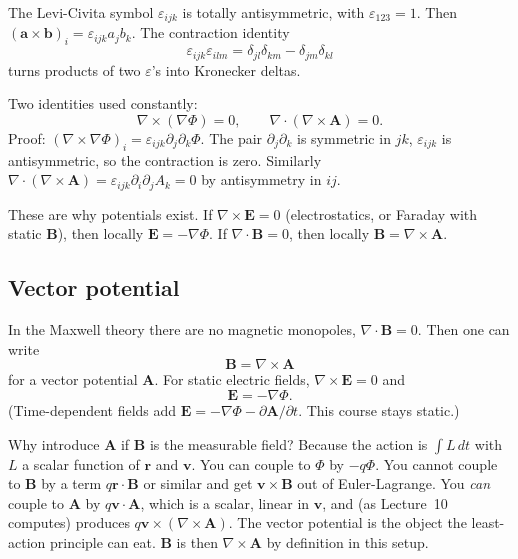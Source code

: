\documentclass[11pt]{article}
\numberwithin{equation}{section}
\newcommand{\vect}[1]{\mathbf{#1}}
\newcommand{\epsijk}{\varepsilon_{ijk}}
\begin{document}
The Levi-Civita symbol $\epsijk$ is totally antisymmetric, with $\varepsilon_{123}=1$. Then $(\vect{a}\times\vect{b})_i=\epsijk a_j b_k$. The contraction identity
\[
\epsijk\varepsilon_{ilm} = \delta_{jl}\delta_{km}-\delta_{jm}\delta_{kl}
\]
turns products of two $\varepsilon$'s into Kronecker deltas.

Two identities used constantly:
\begin{equation}
\label{eq:vecid}
\nabla\times(\nabla\Phi)=0,\qquad
\nabla\cdot(\nabla\times\vect{A})=0.
\end{equation}
Proof: $(\nabla\times\nabla\Phi)_i=\epsijk\partial_j\partial_k\Phi$. The pair $\partial_j\partial_k$ is symmetric in $jk$, $\epsijk$ is antisymmetric, so the contraction is zero. Similarly $\nabla\cdot(\nabla\times\vect{A})=\epsijk\partial_i\partial_j A_k=0$ by antisymmetry in $ij$.

These are why potentials exist. If $\nabla\times\vect{E}=0$ (electrostatics, or Faraday with static $\vect{B}$), then locally $\vect{E}=-\nabla\Phi$. If $\nabla\cdot\vect{B}=0$, then locally $\vect{B}=\nabla\times\vect{A}$.

\subsection{Vector potential}

In the Maxwell theory there are no magnetic monopoles, $\nabla\cdot\vect{B}=0$. Then one can write
\begin{equation}
\label{eq:BcurlA}
\vect{B} = \nabla\times\vect{A}
\end{equation}
for a vector potential $\vect{A}$. For static electric fields, $\nabla\times\vect{E}=0$ and
\[
\vect{E} = -\nabla\Phi.
\]
(Time-dependent fields add $\vect{E}=-\nabla\Phi-\partial\vect{A}/\partial t$. This course stays static.)

Why introduce $\vect{A}$ if $\vect{B}$ is the measurable field? Because the action is $\int L\,dt$ with $L$ a scalar function of $\vect{r}$ and $\vect{v}$. You can couple to $\Phi$ by $-q\Phi$. You cannot couple to $\vect{B}$ by a term $q\vect{r}\cdot\vect{B}$ or similar and get $\vect{v}\times\vect{B}$ out of Euler-Lagrange. You \emph{can} couple to $\vect{A}$ by $q\vect{v}\cdot\vect{A}$, which is a scalar, linear in $\vect{v}$, and (as Lecture~10 computes) produces $q\vect{v}\times(\nabla\times\vect{A})$. The vector potential is the object the least-action principle can eat. $\vect{B}$ is then $\nabla\times\vect{A}$ by definition in this setup.
\end{document}
